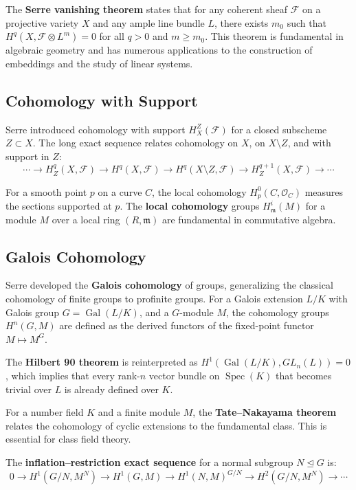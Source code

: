 The \textbf{Serre vanishing theorem} states that for any coherent sheaf $\mathcal{F}$ on a projective variety $X$ and any ample line bundle $L$, there exists $m_0$ such that $H^q(X, \mathcal{F} \otimes L^m) = 0$ for all $q > 0$ and $m \geq m_0$. This theorem is fundamental in algebraic geometry and has numerous applications to the construction of embeddings and the study of linear systems.

\subsection{Cohomology with Support}

Serre introduced cohomology with support $H^Z_X(\mathcal{F})$ for a closed subscheme $Z \subset X$. The long exact sequence relates cohomology on $X$, on $X \setminus Z$, and with support in $Z$:
\[\cdots \to H^q_Z(X, \mathcal{F}) \to H^q(X, \mathcal{F}) \to H^q(X \setminus Z, \mathcal{F}) \to H^{q+1}_Z(X, \mathcal{F}) \to \cdots\]

For a smooth point $p$ on a curve $C$, the local cohomology $H^0_p(C, \mathcal{O}_C)$ measures the sections supported at $p$. The \textbf{local cohomology} groups $H^i_{\mathfrak{m}}(M)$ for a module $M$ over a local ring $(R, \mathfrak{m})$ are fundamental in commutative algebra.

\subsection{Galois Cohomology}

Serre developed the \textbf{Galois cohomology} of groups, generalizing the classical cohomology of finite groups to profinite groups. For a Galois extension $L/K$ with Galois group $G = \operatorname{Gal}(L/K)$, and a $G$-module $M$, the cohomology groups $H^n(G, M)$ are defined as the derived functors of the fixed-point functor $M \mapsto M^G$.

The \textbf{Hilbert 90 theorem} is reinterpreted as $H^1(\operatorname{Gal}(L/K), GL_n(L)) = 0$, which implies that every rank-$n$ vector bundle on $\operatorname{Spec}(K)$ that becomes trivial over $L$ is already defined over $K$.

For a number field $K$ and a finite module $M$, the \textbf{Tate--Nakayama theorem} relates the cohomology of cyclic extensions to the fundamental class. This is essential for class field theory.

The \textbf{inflation--restriction exact sequence} for a normal subgroup $N \trianglelefteq G$ is:
\[0 \to H^1(G/N, M^N) \to H^1(G, M) \to H^1(N, M)^{G/N} \to H^2(G/N, M^N) \to \cdots\]

